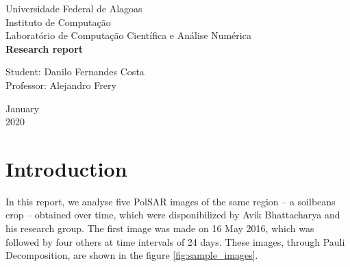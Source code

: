 \documentclass[12pt]{article}
\begin{document}

\begin{titlepage}
\begin{center}

\Huge{Universidade Federal de Alagoas}\\
\large{Instituto de Computação}\\ 
\large{Laboratório de Computação Científica e Análise Numérica}\\ 
\vspace{220pt}
\textbf{\LARGE{Research report}}\\
\vspace{3,5cm}
\end{center}

\begin{flushleft}
\begin{tabbing}
Student: Danilo Fernandes Costa\\
Professor: Alejandro Frery\\
\end{tabbing}
\end{flushleft}
\vspace{1cm}

\begin{center}
\vspace{\fill}
January\\
2020
\end{center}
\end{titlepage}

\section{Introduction}

In this report, we analyse five PolSAR images of the same region -- a soilbeans crop -- obtained over time, which were disponibilized by Avik Bhattacharya and his research group. The first image was made on 16 May 2016, which was followed by four others at time intervals of 24 days. These images, through Pauli Decomposition, are shown in the figure \ref{fig:sample_images}. 
\end{document}
